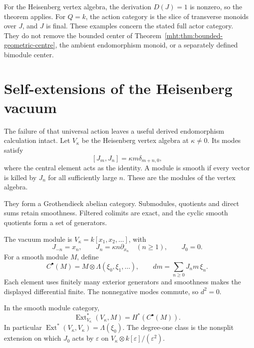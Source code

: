 For the Heisenberg vertex algebra, the derivation
$D(J)=1$ is nonzero, so the theorem applies.
For $Q=k$, the action category is the slice of
transverse monoids over $J$, and $J$ is final.
These examples concern the stated full actor
category. They do not remove the bounded center
of Theorem~\ref{mht:thm:bounded-geometric-centre},
the ambient endomorphism monoid, or a separately
defined bimodule center.

\section{Self-extensions of the Heisenberg vacuum}

The failure of that universal action leaves a useful
derived endomorphism calculation intact. Let $V_\kappa$
be the Heisenberg vertex algebra at $\kappa\ne0$.
Its modes satisfy
\[
 [J_m,J_n]=\kappa m\delta_{m+n,0},
\]
where the central element acts as the identity.
A module is smooth if every vector is killed by
$J_n$ for all sufficiently large $n$. These are the
modules of the vertex algebra. 

They form a Grothendieck abelian category. Submodules,
quotients and direct sums retain smoothness. Filtered colimits
are exact, and the cyclic smooth quotients form a set of generators.

The vacuum module is
$V_\kappa=k[x_1,x_2,\ldots]$, with
\[
 J_{-n}=x_n,\qquad
 J_n=\kappa n\partial_{x_n}\quad(n\geq1),
 \qquad J_0=0.
\]
For a smooth module $M$, define
\[
 C^\bullet(M)=M\otimes\Lambda(\xi_0,\xi_1,\ldots),
 \qquad dm=\sum_{n\geq0}J_nm\,\xi_n.
\]
Each element uses finitely many exterior generators
and smoothness makes the displayed differential
finite. The nonnegative modes commute, so $d^2=0$.

\begin{proposition}\label{mht:prop:heisenberg-vacuum-ext}
In the smooth module category,
\[
 \operatorname{Ext}^*_{V_\kappa}(V_\kappa,M)
                         =H^*(C^\bullet(M)).
\]
In particular
$\operatorname{Ext}^*(V_\kappa,V_\kappa)=\Lambda(\xi_0)$.
The degree-one class is the nonsplit extension
on which $J_0$ acts by $\varepsilon$ on
$V_\kappa\otimes k[\varepsilon]/(\varepsilon^2)$.
\end{proposition}

